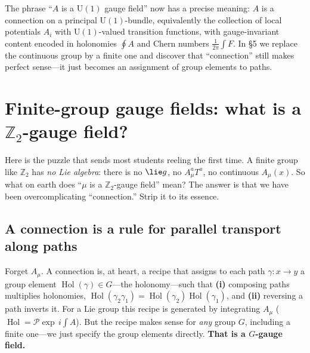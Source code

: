 \documentclass[11pt]{article}
\newcommand{\Pexp}{\mathcal{P}\!\exp}        %
\DeclareMathOperator{\Hol}{Hol}              %
\newcommand{\Uone}{\mathrm{U}(1)}
\newcommand{\Ztwo}{\mathbb{Z}_2}
\begin{document}
\begin{ppreview}
The phrase ``$A$ is a $\Uone$ gauge field'' now has a precise meaning: $A$ is a
connection on a principal $\Uone$-bundle, equivalently the collection of local
potentials $A_i$ with $\Uone$-valued transition functions, with gauge-invariant content
encoded in holonomies $\oint A$ and Chern numbers $\frac1{2\pi}\int F$. In \S5 we
replace the continuous group by a finite one and discover that ``connection'' still
makes perfect sense---it just becomes an assignment of group elements to paths.
\end{ppreview}

\section{Finite-group gauge fields: what is a \texorpdfstring{$\Ztwo$}{Z2}-gauge field?}
\label{sec:finite}

Here is the puzzle that sends most students reeling the first time. A finite group like
$\Ztwo$ has \emph{no Lie algebra}: there is no $\lie g$, no $A_\mu^a T^a$, no continuous
$A_\mu(x)$. So what on earth does ``$\mu$ is a $\Ztwo$-gauge field'' mean? The answer is
that we have been overcomplicating ``connection.'' Strip it to its essence.

\subsection{A connection is a rule for parallel transport along paths}

\begin{iintuition}
Forget $A_\mu$. A connection is, at heart, a recipe that assigns to each path
$\gamma:x\to y$ a group element $\Hol(\gamma)\in G$---the holonomy---such that
\textbf{(i)} composing paths multiplies holonomies, $\Hol(\gamma_2\gamma_1) =
\Hol(\gamma_2)\Hol(\gamma_1)$, and \textbf{(ii)} reversing a path inverts it. For a Lie
group this recipe is generated by integrating $A_\mu$ ($\Hol = \Pexp\, i\!\int A$). But
the recipe makes sense for \emph{any} group $G$, including a finite one---we just
specify the group elements directly. \textbf{That is a $G$-gauge field.}
\end{iintuition}
\end{document}
